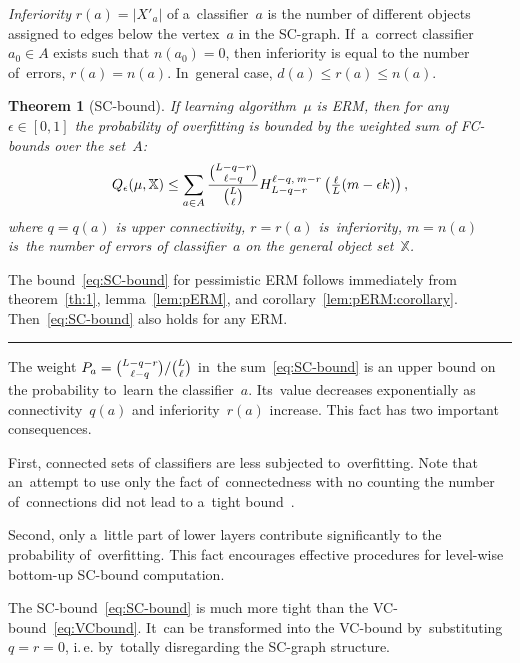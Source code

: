 \documentclass{article} %
\def\XX{\mathbb{X}}
\def\CC_#1^#2{\tbinom{#1}{#2}}
\def\eps{\epsilon}
\newcommand{\hypergeom}[5]{{#1}_{#2}^{#4,\:#3}\left(#5\right)}
\newcommand{\Hyper}[4]{\hypergeom{H}{#1}{#2}{#3}{#4}}
\newtheorem{theorem}{Theorem}
\newcommand{\qed}{\hfill\rule{7pt}{7pt}}
\newenvironment{proof}{\noindent{\bf Proof:}}{\qed\medskip}
\begin{document}
\medskip
\emph{Inferiority} $r(a)=|X'_a|$ of a~classifier~$a$
is the number of different objects assigned to edges below the vertex~$a$ in the SC-graph.
If~a~correct classifier $a_0\in A$ exists such that $n(a_0)=0$,
then inferiority is equal to the number of~errors, $r(a) = n(a)$.
In~general case, $d(a) \leq r(a)\leq n(a)$.

\begin{theorem}[SC-bound]
\label{th:SC-bound}
    If learning algorithm~$\mu$ is ERM, then for any $\eps\in[0,1]$
    the probability of overfitting is bounded by the weighted sum of FC-bounds over the set~$A$:
    \begin{equation}
    \label{eq:SC-bound}
        Q_\eps(\mu,\XX)
        \leq
        \sum_{a\in A}
            \frac{\CC_{L-q-r}^{\ell-q}}{\CC_{L}^{\ell}}
            \Hyper{L-q-r}{m-r}{\ell-q}{\tfrac\ell L (m - \eps k)},
    \end{equation}
    where
    $q = q(a)$ is upper connectivity,\;
    $r = r(a)$ is~inferiority,\;
    $m = n(a)$ is~the number of errors
    of classifier~$a$ on the general object set~$\XX$.
\end{theorem}
\begin{proof}
    The bound~\eqref{eq:SC-bound} for pessimistic ERM
    follows immediately  from
    theorem~\ref{th:1},
    lemma~\ref{lem:pERM},
    and corollary~\ref{lem:pERM:corollary}.
    Then~\eqref{eq:SC-bound} also holds for any ERM.
\end{proof}

The weight
$P_a = {\CC_{L-q-r}^{\ell-q}} / {\CC_{L}^{\ell}}$
in~the sum~\eqref{eq:SC-bound}
is an upper bound on the probability to~learn the classifier~$a$.
Its~value  decreases exponentially as connectivity~$q(a)$ and inferiority~$r(a)$ increase.
This fact has two important consequences.

First, connected sets of classifiers are less subjected to~overfitting.
Note that an~attempt to use only the fact of~connectedness
with no counting the number of~connections
did not lead to a~tight bound~\cite{sill98phd}.

Second, only a~little part of lower layers contribute significantly to the probability of~overfitting.
This fact encourages effective procedures for level-wise bottom-up SC-bound computation.

The SC-bound~\eqref{eq:SC-bound} is much more tight than the VC-bound~\eqref{eq:VCbound}.
It~can be transformed into the VC-bound by~substituting $q = r = 0$,
i.\,e. by~totally disregarding the SC-graph structure.
\end{document}
